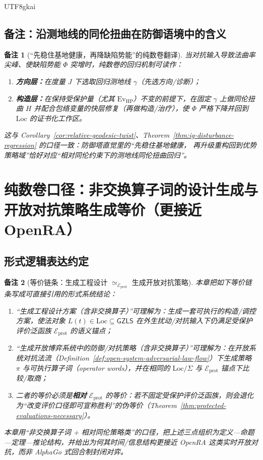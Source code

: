\documentclass[12pt]{article}
\newtheorem{remark}{备注}[section]
\newcommand{\GZLS}{\ensuremath{\mathsf{GZLS}}}
\begin{document}
\begin{CJK*}{UTF8}{gkai}
\subsection{备注：沿测地线的同伦扭曲在防御语境中的含义}

\begin{remark}[“先稳住基地健康，再降缺陷势能”的纯数卷翻译]
当对抗输入导致法曲率尖峰、使缺陷势能 $\Phi$ 突增时，纯数卷的回归机制可读作：
\begin{enumerate}
  \item \textbf{方向层：}在度量 $J$ 下选取回归测地线 $\gamma$（先选方向/诊断）；
  \item \textbf{构造层：}在保持受保护量（尤其 $\mathrm{Ev}_{\mathrm{HP}}$）不变的前提下，在固定 $\gamma$ 上做同伦扭曲 $H$ 并配合包络变量的快层修复（再做构造/治疗），使
    $\Phi$ 严格下降并回到 $\mathrm{Loc}$ 的证书化工作区。
\end{enumerate}
这与 Corollary~\ref{cor:relative-geodesic-twist}、Theorem~\ref{thm:ig-disturbance-regression} 的口径一致：防御塔直觉里的“先稳住基地健康，
  再升级重构回到优势策略域”恰好对应“相对同伦约束下的测地线同伦扭曲回归”。
\end{remark}

\clearpage
\section{纯数卷口径：非交换算子词的设计生成与开放对抗策略生成等价（更接近 \textsf{OpenRA}）}
\label{sec:puremath-noncommutative-design-strategy}

\subsection{形式逻辑表达约定}

\begin{remark}[等价链条：生成工程设计 $\simeq_{\mathcal{E}_{\mathrm{prot}}}$ 生成开放对抗策略]
本章把如下等价链条写成可直接引用的形式系统结论：
\begin{enumerate}
  \item “生成工程设计方案（含非交换算子）”可理解为：生成一套可执行的构造/调控方案，使法对象 $L(t)\in\mathrm{Loc}\subseteq\GZLS$ 在外生扰动/对抗输入下仍满足受保护评价泛函族
    $\mathcal{E}_{\mathrm{prot}}$ 的语义锚点；
  \item “生成开放博弈系统中的防御/对抗策略（含非交换算子）”可理解为：在开放系统对抗法流（Definition~\ref{def:open-system-adversarial-law-flow}）下生成策略 $\pi$
    与可执行算子词（operator words），并在相同的 $\mathrm{Loc}/\Sigma$ 与 $\mathcal{E}_{\mathrm{prot}}$ 锚点下比较/取商；
  \item 二者的等价必须是\textbf{相对} $\mathcal{E}_{\mathrm{prot}}$ 的等价：若不固定受保护评价泛函族，则会退化为“改变评价口径即可宣称胜利”的伪等价（Theorem~\ref{thm:protected-evaluations-necessary}）。
\end{enumerate}
本章用“非交换算子词 + 相对同伦策略类”的口径，把上述三点组织为定义—命题—定理—推论结构，并给出为何其时间/信息结构更接近 \textsf{OpenRA} 这类实时开放对抗，而非 \textsf{AlphaGo} 式回合制封闭对弈。
\end{remark}


\end{CJK*}
\end{document}
